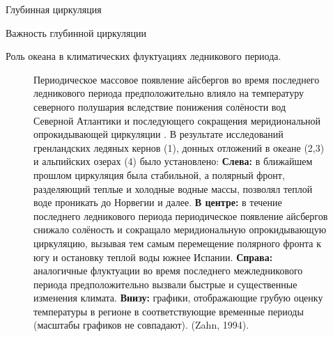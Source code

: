 \begin{chapter}{Глубинная циркуляция}
\begin{section}{Важность глубинной циркуляции}
\begin{paragraph}{Роль океана в климатических флуктуациях ледникового периода.}
\begin{enumerate}
\begin{figure}[t!]
\caption{Периодическое массовое появление айсбергов во время последнего
ледникового периода предположительно влияло на температуру северного полушария
вследствие понижения солёности вод Северной Атлантики и последующего 
сокращения меридиональной опрокидывающей циркуляции%
. В результате исследований
гренландских ледяных кернов (1), донных отложений в океане (2,3) и альпийских
озерах (4) было установлено:
\textbf{Слева:} в ближайшем прошлом циркуляция была стабильной, а полярный
фронт, разделяющий теплые и холодные водные массы, позволял теплой воде
проникать до Норвегии и далее.
\textbf{В центре:} в течение последнего ледникового периода периодическое
появление айсбергов снижало солёность и сокращало меридиональную 
опрокидывающую циркуляцию, вызывая тем самым перемещение полярного фронта
к югу и остановку теплой воды южнее Испании.
\textbf{Справа:} аналогичные флуктуации во время последнего межледникового
периода предположительно вызвали быстрые и существенные изменения климата.
\textbf{Внизу:} графики, отображающие грубую оценку температуры в регионе
в соответствующие временные периоды (масштабы графиков не совпадают).
(Zahn, 1994).}
\label{fig:NAiceage}
\end{figure}
%

\end{enumerate}
\end{paragraph}
\end{section}
\end{chapter}
